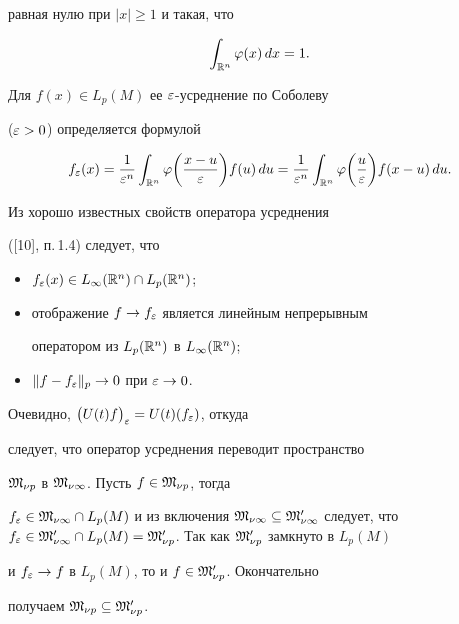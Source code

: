 \begin{pf}
равная нулю при $|x|\ge 1$ и такая, что


$$


\int_{\Ra^n}\f(x)\,dx=1.


$$


Для $f(x)\in L_p(M)$ ее $\varepsilon$-усреднение по Соболеву


($\varepsilon>0$) определяется формулой


$$


f_\ep(x)=\frac 1{\ep^n}\int_{\Ra^n}\f\bigg(\frac{x-u}\ep\bigg)


f(u)\,du=


\frac 1{\ep^n}\int_{\Ra^n}\f\bigg(\frac u\ep\bigg) f(x-u)\,du.


$$





Из хорошо известных свойств оператора усреднения


([10], п.\,1.4) следует, что


\begin{itemize}


\item[1)] $f_\varepsilon(x)\in L_\infty(\Bbb R^n)\cap L_p(\Bbb R^n)$;


\item[2)] отображение $f\to f_\varepsilon$ является линейным непрерывным


оператором из $L_p(\Bbb R^n)$ в $L_\infty(\Bbb R^n)$;


\item[3)] $\|f-f_\varepsilon\|_p\to 0$ при $\varepsilon\to 0$.


\end{itemize}





Очевидно, $\bigl( U(t)f\bigr)_\varepsilon=U(t)(f_\varepsilon)$, откуда


следует, что оператор усреднения переводит пространство


$\frak M_{\nu p}$ в $\frak M_{\nu\infty}$. Пусть $f\in\frak M_{\nu p}$, тогда


$f_\ep\in\Mg_{\nu\8}\cap L_p(M)$ и из включения $\Mg_{\nu\8}


\subseteq\Mg'_{\nu\8}$ следует, что $f_\ep\in\Mg'_{\nu\8} \cap


L_p(M)=\Mg'_{\nu p}$. Так как $\Mg'_{\nu p}$ замкнуто в $L_p(M)$


и $f_\varepsilon\to f$ в $L_p(M)$, то и $f\in\frak M'_{\nu p}$. Окончательно


получаем $\frak M_{\nu p}\subseteq\frak M'_{\nu p}$.


\end{pf}





